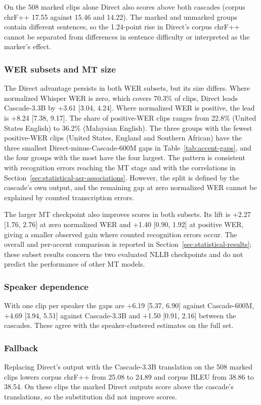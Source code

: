 On the 508 marked clips alone Direct also scores above both cascades (corpus
chrF++ 17.55 against 15.46 and 14.22). The marked and unmarked groups contain
different sentences, so the 1.24-point rise in Direct's corpus chrF++ cannot
be separated from differences in sentence difficulty or interpreted as the
marker's effect.

\subsubsection{WER subsets and MT size}
The Direct advantage persists in both WER subsets, but its size differs.
Where normalized Whisper WER is zero, which covers 70.3\% of clips, Direct
leads Cascade-3.3B by +3.61 [3.04, 4.24]. Where normalized WER is positive,
the lead is +8.24 [7.38, 9.17]. The share of positive-WER clips ranges from 22.8\% (United States English)
to 36.2\% (Malaysian English). The three groups with the fewest positive-WER clips
(United States, England and Southern African) have the three smallest
Direct-minus-Cascade-600M gaps in Table~\ref{tab:accent-gaps}, and the four
groups with the most have the four largest. The pattern is consistent with recognition errors
reaching the MT stage and with the correlations in
Section~\ref{sec:statistical-asr-associations}. However, the split is defined by
the cascade's own output, and the remaining gap at zero normalized WER cannot
be explained by counted transcription errors.

The larger MT checkpoint also improves scores in both subsets. Its lift is
+2.27 [1.76, 2.76] at zero normalized WER and +1.40 [0.90, 1.92] at positive
WER, giving a smaller observed gain where counted recognition errors occur.
The overall and per-accent comparison is reported in
Section~\ref{sec:statistical-results}; these subset results concern the two
evaluated NLLB checkpoints and do not predict the performance of other MT
models.

\subsubsection{Speaker dependence}
With one clip per speaker the gaps are +6.19 [5.37, 6.90] against Cascade-600M, +4.69 [3.94, 5.51] against Cascade-3.3B and +1.50 [0.91, 2.16] between the cascades. These agree with the speaker-clustered estimates on the full set.

\subsubsection{Fallback}
Replacing Direct's output with the Cascade-3.3B translation on the 508 marked clips lowers corpus chrF++ from 25.08 to 24.89 and corpus BLEU from 38.86 to 38.54. On these clips the marked Direct outputs score above the cascade's translations, so the substitution did not improve scores.


